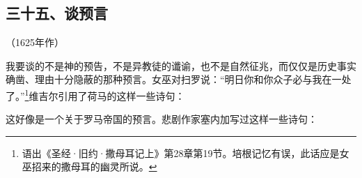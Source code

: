 \subsection*{三十五、谈预言}
\begin{center}
    （1625年作）
\end{center}
\par 我要谈的不是神的预告，不是异教徒的谶谕，也不是自然征兆，而仅仅是历史事实确凿、理由十分隐蔽的那种预言。女巫对扫罗说：“明日你和你众子必与我在一处了。”\footnote{语出《圣经·旧约·撒母耳记上》第28章第19节。培根记忆有误，此话应是女巫招来的撒母耳的幽灵所说。}维吉尔引用了荷马的这样一些诗句：
\par 这好像是一个关于罗马帝国的预言。悲剧作家塞内加写过这样一些诗句：
